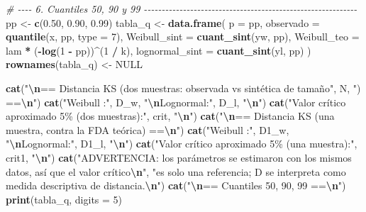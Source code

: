 \documentclass[
  spanish,
]{article}
\newenvironment{Shaded}{\begin{snugshade}}{\end{snugshade}}
\newcommand{\AttributeTok}[1]{\textcolor[rgb]{0.13,0.29,0.53}{#1}}
\newcommand{\CommentTok}[1]{\textcolor[rgb]{0.56,0.35,0.01}{\textit{#1}}}
\newcommand{\ConstantTok}[1]{\textcolor[rgb]{0.56,0.35,0.01}{#1}}
\newcommand{\DecValTok}[1]{\textcolor[rgb]{0.00,0.00,0.81}{#1}}
\newcommand{\FloatTok}[1]{\textcolor[rgb]{0.00,0.00,0.81}{#1}}
\newcommand{\FunctionTok}[1]{\textcolor[rgb]{0.13,0.29,0.53}{\textbf{#1}}}
\newcommand{\NormalTok}[1]{#1}
\newcommand{\OtherTok}[1]{\textcolor[rgb]{0.56,0.35,0.01}{#1}}
\newcommand{\SpecialCharTok}[1]{\textcolor[rgb]{0.81,0.36,0.00}{\textbf{#1}}}
\newcommand{\StringTok}[1]{\textcolor[rgb]{0.31,0.60,0.02}{#1}}
\begin{document}
\begin{Shaded}
\begin{Highlighting}[]
\CommentTok{\# {-}{-}{-}{-} 6. Cuantiles 50, 90 y 99 {-}{-}{-}{-}{-}{-}{-}{-}{-}{-}{-}{-}{-}{-}{-}{-}{-}{-}{-}{-}{-}{-}{-}{-}{-}{-}{-}{-}{-}{-}{-}{-}{-}{-}{-}{-}{-}{-}{-}{-}{-}{-}{-}{-}{-}{-}{-}{-}{-}{-}{-}{-}{-}{-}{-}{-}{-}{-}{-}{-}}
\NormalTok{pp }\OtherTok{\textless{}{-}} \FunctionTok{c}\NormalTok{(}\FloatTok{0.50}\NormalTok{, }\FloatTok{0.90}\NormalTok{, }\FloatTok{0.99}\NormalTok{)}
\NormalTok{tabla\_q }\OtherTok{\textless{}{-}} \FunctionTok{data.frame}\NormalTok{(}
  \AttributeTok{p =}\NormalTok{ pp,}
  \AttributeTok{observado      =} \FunctionTok{quantile}\NormalTok{(x, pp, }\AttributeTok{type =} \DecValTok{7}\NormalTok{),}
  \AttributeTok{Weibull\_sint   =} \FunctionTok{cuant\_sint}\NormalTok{(yw, pp),}
  \AttributeTok{Weibull\_teo    =}\NormalTok{ lam }\SpecialCharTok{*}\NormalTok{ (}\SpecialCharTok{{-}}\FunctionTok{log}\NormalTok{(}\DecValTok{1} \SpecialCharTok{{-}}\NormalTok{ pp))}\SpecialCharTok{\^{}}\NormalTok{(}\DecValTok{1} \SpecialCharTok{/}\NormalTok{ k),}
  \AttributeTok{lognormal\_sint =} \FunctionTok{cuant\_sint}\NormalTok{(yl, pp)}
\NormalTok{)}
\FunctionTok{rownames}\NormalTok{(tabla\_q) }\OtherTok{\textless{}{-}} \ConstantTok{NULL}

\FunctionTok{cat}\NormalTok{(}\StringTok{"}\SpecialCharTok{\textbackslash{}n}\StringTok{== Distancia KS (dos muestras: observada vs sintética de tamaño"}\NormalTok{, N, }\StringTok{") ==}\SpecialCharTok{\textbackslash{}n}\StringTok{"}\NormalTok{)}
\FunctionTok{cat}\NormalTok{(}\StringTok{"Weibull  :"}\NormalTok{, D\_w, }\StringTok{"}\SpecialCharTok{\textbackslash{}n}\StringTok{Lognormal:"}\NormalTok{, D\_l, }\StringTok{"}\SpecialCharTok{\textbackslash{}n}\StringTok{"}\NormalTok{)}
\FunctionTok{cat}\NormalTok{(}\StringTok{"Valor crítico aproximado 5\% (dos muestras):"}\NormalTok{, crit, }\StringTok{"}\SpecialCharTok{\textbackslash{}n}\StringTok{"}\NormalTok{)}
\FunctionTok{cat}\NormalTok{(}\StringTok{"}\SpecialCharTok{\textbackslash{}n}\StringTok{== Distancia KS (una muestra, contra la FDA teórica) ==}\SpecialCharTok{\textbackslash{}n}\StringTok{"}\NormalTok{)}
\FunctionTok{cat}\NormalTok{(}\StringTok{"Weibull  :"}\NormalTok{, D1\_w, }\StringTok{"}\SpecialCharTok{\textbackslash{}n}\StringTok{Lognormal:"}\NormalTok{, D1\_l, }\StringTok{"}\SpecialCharTok{\textbackslash{}n}\StringTok{"}\NormalTok{)}
\FunctionTok{cat}\NormalTok{(}\StringTok{"Valor crítico aproximado 5\% (una muestra):"}\NormalTok{, crit1, }\StringTok{"}\SpecialCharTok{\textbackslash{}n}\StringTok{"}\NormalTok{)}
\FunctionTok{cat}\NormalTok{(}\StringTok{"ADVERTENCIA: los parámetros se estimaron con los mismos datos, así que el valor crítico}\SpecialCharTok{\textbackslash{}n}\StringTok{"}\NormalTok{,}
    \StringTok{"es solo una referencia; D se interpreta como medida descriptiva de distancia.}\SpecialCharTok{\textbackslash{}n}\StringTok{"}\NormalTok{)}
\FunctionTok{cat}\NormalTok{(}\StringTok{"}\SpecialCharTok{\textbackslash{}n}\StringTok{== Cuantiles 50, 90, 99 ==}\SpecialCharTok{\textbackslash{}n}\StringTok{"}\NormalTok{)}
\FunctionTok{print}\NormalTok{(tabla\_q, }\AttributeTok{digits =} \DecValTok{5}\NormalTok{)}


\end{Highlighting}
\end{Shaded}
\end{document}
